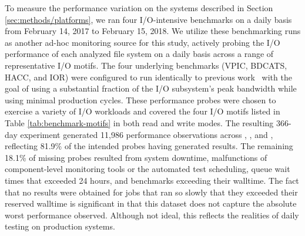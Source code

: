 To measure the performance variation on the systems described in Section \ref{sec:methods/platforms}, we ran four I/O-intensive benchmarks on a daily basis from February 14, 2017 to February 15, 2018.
We utilize these benchmarking runs as another ad-hoc monitoring source for this study, actively probing the I/O performance of each analyzed file system on a daily basis across a range of representative I/O motifs.
The four underlying benchmarks (VPIC, BDCATS, HACC, and IOR) were configured to run identically to previous work~\cite{Lockwood2017} with the goal of using a substantial fraction of the I/O subsystem's peak bandwidth while using minimal production cycles.
These performance probes were chosen to exercise a variety of I/O workloads and covered the four I/O motifs listed in Table \ref{tab:benchmark-motifs} in both read and write modes.
The resulting 366-day experiment generated 11,986 performance observations across \mira, \cori, and \edison, reflecting 81.9\% of the intended probes having generated results.
The remaining 18.1\% of missing probes resulted from system downtime, malfunctions of component-level monitoring tools or the automated test scheduling, queue wait times that exceeded 24 hours, and benchmarks exceeding their walltime.
The fact that no results were obtained for jobs that ran so slowly that they exceeded their reserved walltime is significant in that this dataset does not capture the absolute worst performance observed.
Although not ideal, this reflects the realities of daily testing on production systems.

